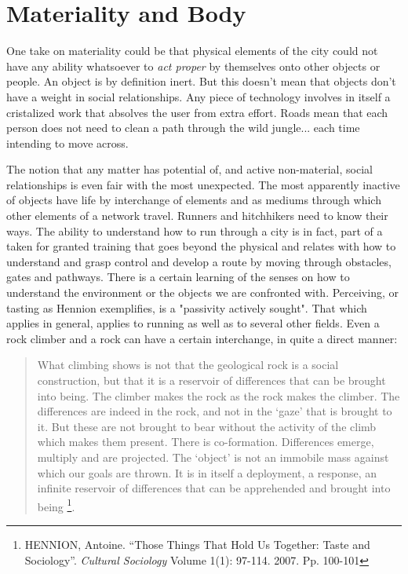 \section*{Materiality and Body}

One take on materiality could be that physical elements of the city could not have any ability whatsoever to \textit{act proper} by themselves onto other objects or people. An object is by definition inert. But this doesn't mean that objects don't have a weight in social relationships. Any piece of technology involves in itself a cristalized work that absolves the user from extra effort. Roads mean that each person does not need to clean a path through the wild jungle... each time intending to move across.

The notion that any matter has potential of, and active non-material, social relationships is even fair with the most unexpected.
The most apparently inactive of objects have life by interchange of elements and as mediums through which other elements of a network travel. Runners and hitchhikers need to know their ways. The ability to understand how to run through a city is in fact, part of a taken for granted training that goes beyond the physical and relates with how to understand and grasp control and develop a route by moving through obstacles, gates and pathways. There is a certain learning of the senses on how to understand the environment or the objects we are confronted with. Perceiving, or tasting as Hennion exemplifies, is a "passivity actively sought". That which applies in general, applies to running as well as to several other fields. Even a rock climber and a rock can have a certain interchange, in quite a direct manner:

\begin{quote}
 What climbing shows is not that the geological rock is a social construction, but that it is a reservoir of differences that can be brought into being. The climber makes the rock as the rock makes the climber. The differences are indeed in the rock, and not in the ‘gaze’ that is brought to it. But these are not brought to bear without the activity of the climb which makes them present. There is co-formation. Differences emerge, multiply and are projected. The ‘object’ is not an immobile mass against which our goals are thrown. It is in itself a deployment, a response, an infinite reservoir of differences that can be apprehended and brought into being%
 \footnote{HENNION, Antoine. ``Those Things That Hold Us Together: Taste and Sociology''. \textit{Cultural Sociology} Volume 1(1): 97-114. 2007. Pp. 100-101}.
\end{quote}

